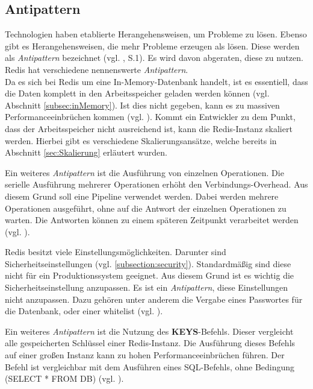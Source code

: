 
\subsection{Antipattern}
Technologien haben etablierte Herangehensweisen, um Probleme zu lösen. Ebenso gibt es Herangehensweisen, die mehr Probleme erzeugen als lösen. Diese werden als \textit{Antipattern} bezeichnet (vgl. \cite{antipattern}, S.1). Es wird davon abgeraten, diese zu nutzen. \acs{Redis} hat verschiedene nennenswerte \textit{Antipattern}.
\\
Da es sich bei \acs{Redis} um eine In-Memory-Datenbank handelt, ist es essentiell, dass die Daten komplett in den Arbeitsspeicher geladen werden können (vgl. Abschnitt \autoref{subsec:inMemory}). Ist dies nicht gegeben, kann es zu massiven Performanceeinbrüchen kommen (vgl. \cite{Redis-Docs-antipattern}). Kommt ein Entwickler zu dem Punkt, dass der Arbeitsspeicher nicht ausreichend ist, kann die \acs{Redis}-Instanz skaliert werden. Hierbei gibt es verschiedene Skalierungsansätze, welche bereits in Abschnitt \ref{sec:Skalierung} erläutert wurden.

Ein weiteres \textit{Antipattern} ist die Ausführung von einzelnen Operationen. Die serielle Ausführung mehrerer Operationen erhöht den Verbindungs-Overhead. Aus diesem Grund soll eine Pipeline verwendet werden. Dabei werden mehrere Operationen ausgeführt, ohne auf die Antwort der einzelnen Operationen zu warten. Die Antworten können zu einem späteren Zeitpunkt verarbeitet werden (vgl. \cite{Redis-Docs-antipattern}).

\acs{Redis} besitzt viele Einstellungsmöglichkeiten. Darunter sind Sicherheitseinstellungen (vgl. \autoref{subsection:security}). Standardmäßig sind diese nicht für ein Produktionssystem geeignet. Aus diesem Grund ist es wichtig die Sicherheitseinstellung anzupassen. Es ist ein \textit{Antipattern}, diese Einstellungen nicht anzupassen. Dazu gehören unter anderem die Vergabe eines Passwortes für die Datenbank, oder einer \gls{whitelist} (vgl. \cite{Redis-Docs-antipattern}).

Ein weiteres \textit{Antipattern} ist die Nutzung des \textbf{KEYS}-Befehls. Dieser vergleicht alle gespeicherten Schlüssel einer \acs{Redis}-Instanz. Die Ausführung dieses Befehls auf einer großen Instanz kann zu hohen Performanceeinbrüchen führen. Der Befehl ist vergleichbar mit dem Ausführen eines SQL-Befehls, ohne Bedingung (SELECT * FROM DB) (vgl. \cite{Redis-Docs-antipattern}).